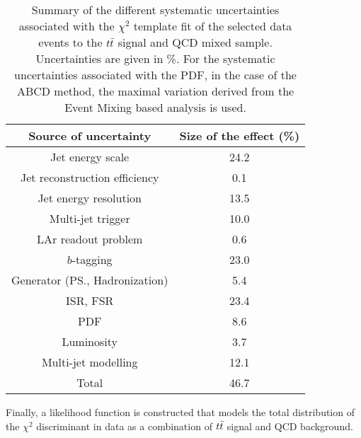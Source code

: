 \begin{table}[!h]
    \begin{center}
      \begin{tabular}{c|c}
          \hline
              \hline
              Source of uncertainty            &  Size of the effect (\%)\\
              \hline
              Jet energy scale              &          24.2    \\
              Jet reconstruction efficiency &           0.1    \\
              Jet energy resolution         &          13.5    \\
              Multi-jet trigger             &          10.0    \\
              LAr readout problem           &           0.6    \\
              $b$-tagging                   &          23.0    \\
              Generator (PS., Hadronization)&           5.4    \\
              ISR, FSR                      &          23.4    \\
              PDF                           &           8.6    \\
              Luminosity                    &           3.7    \\
              Multi-jet modelling           &          12.1    \\
              \hline
              \hline
              Total                         &          46.7    \\
              \hline
              \hline

              \end{tabular}
              \end{center}
               \caption{Summary of the different systematic uncertainties associated with the $\chi^2$
                template fit of the selected data events to the $t\bar{t}$ signal and \mj
                 QCD mixed sample. Uncertainties are given in \%. For the systematic uncertainties associated with the PDF, in the case of the ABCD method, the maximal variation derived from the Event Mixing based analysis is used.}
                   \label{tab:finaluncertainties}
                   \end{table}
Finally, a likelihood function is constructed that models the total distribution of the $\chi^2$ discriminant in data
as a combination of $t\bar{t}$ signal and QCD background.
